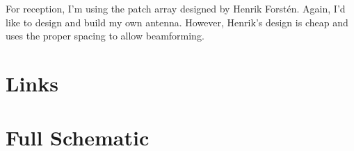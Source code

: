 \documentclass{default}
\newcounter{includepdfpage}
\begin{document}
For reception, I'm using the patch array designed by Henrik Forst\'en. Again, I'd like to design and
build my own antenna. However, Henrik's design is cheap and uses the proper spacing to allow
beamforming.



\begin{appendices}

        

        \chapter{Links}
        \label{cha:links}


        \chapter{Full Schematic}
        \label{cha:schematic}

        

\end{appendices}
\end{document}

